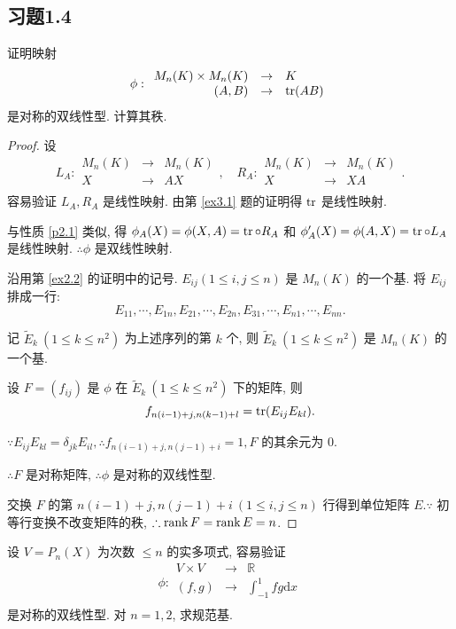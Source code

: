\documentclass{ctexart}
\begin{document}
\subsection{习题1.4}
\begin{exercisec}%
    证明映射
    \[\phi:\begin{array}{rcl}
        M_n(K)\times M_n(K) & \to & K \\
        (A,B) & \to & \operatorname{tr} (AB) \\
    \end{array}\]
    是对称的双线性型. 计算其秩.
\end{exercisec}
\begin{proof}
    设
    \[L_A:\begin{array}{rcl}
            M_n(K) & \to & M_n(K) \\
            X & \to & AX \\
        \end{array},\quad R_A:\begin{array}{rcl}
            M_n(K) & \to & M_n(K) \\
            X & \to & XA \\
        \end{array}.\]
    容易验证 $L_A,R_A$ 是线性映射. 由第 \ref{ex3.1} 题的证明得 $\operatorname{tr} $ 是线性映射.
    
    与性质 \ref{p2.1} 类似, 得 $\phi_A(X)=\phi(X,A)=\operatorname{tr} \circ R_A$ 和 $\phi_A'(X)=\phi(A,X)=\operatorname{tr} \circ L_A$ 是线性映射. $\therefore\phi$ 是双线性映射.

    沿用第 \ref{ex2.2} 的证明中的记号. $E_{ij}(1\leq i,j\leq n)$ 是 $M_n(K)$ 的一个基. 将 $E_{ij}$ 排成一行:
    \[E_{11},\cdots,E_{1n},E_{21},\cdots,E_{2n},E_{31},\cdots,E_{n1},\cdots,E_{nn}.\]

    记 $\tilde{E}_k\ (1\leq k\leq n^2)$ 为上述序列的第 $k$ 个, 则 $\tilde{E}_k\ (1\leq k\leq n^2)$ 是 $M_n(K)$ 的一个基.
    
    设 $F=(f_{ij})$ 是 $\phi$ 在 $\tilde{E}_k\ (1\leq k\leq n^2)$ 下的矩阵, 则
    \[f_{n(i-1)+j,n(k-1)+l}=\operatorname{tr} (E_{ij}E_{kl}).\]

    $\because E_{ij}E_{kl}=\delta_{jk}E_{il},\therefore f_{n(i-1)+j,n(j-1)+i}=1,F$ 的其余元为 $0$.

    $\therefore F$ 是对称矩阵, $\therefore\phi$ 是对称的双线性型.

    交换 $F$ 的第 $n(i-1)+j,n(j-1)+i\ (1\leq i,j\leq n)$ 行得到单位矩阵 $E.\because$ 初等行变换不改变矩阵的秩, $\therefore\operatorname{rank} F=\operatorname{rank} E=n$.
\end{proof}
\begin{exercisec}%
    设 $V=P_n(X)$ 为次数 $\leq n$ 的实多项式, 容易验证
    \[\phi:\begin{array}{rcl}
        V\times V & \to & \mathbb{R} \\
        (f,g) & \to & \int_{-1}^1fg\mathrm{d}x \\
    \end{array}\]
    是对称的双线性型. 对 $n=1,2$, 求规范基.
\end{exercisec}
\end{document}
